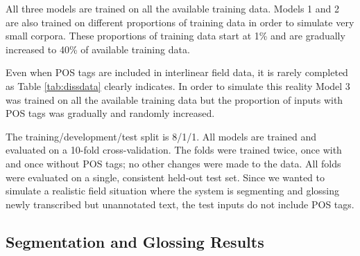 All three models are trained on all the available training data. Models 1 and 2 are also trained on different proportions of training data in order to simulate very small corpora. These proportions of training data start at 1\% and are gradually increased to 40\% of available training data. 

Even when POS tags are included in interlinear field data, it is rarely completed as Table \ref{tab:dissdata} clearly indicates.%
In order to simulate this reality Model 3 was trained on all the available training data but the proportion of inputs with POS tags was gradually and randomly increased.

The training/development/test split is 8/1/1. All models are trained and evaluated on a 10-fold cross-validation. The folds were trained twice, once with and once without POS tags; no other changes were made to the data. All folds were evaluated on a single, consistent held-out test set. Since we wanted to simulate a realistic field situation where the system is segmenting and glossing newly transcribed but unannotated text, the test inputs do not include POS tags. 


\subsection{Segmentation and Glossing Results}
\label{sec:segglsresults}


